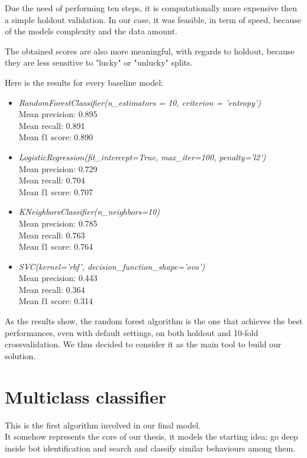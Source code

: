 Due the need of performing ten steps, it is computationally more expensive then a simple holdout validation. In our case, it was feasible, in term of speed, because of the models complexity and the data amount.

The obtained scores are also more meaningful, with regards to holdout, because they are less sensitive to "lucky" or "unlucky" splits.

Here is the results for every baseline model:

\begin{itemize}
	\item[\PencilRight] \textit{RandomForestClassifier(n\_estimators = 10, criterion = 'entropy')}\\
	Mean precision: 0.895\\
	Mean recall: 0.891\\
	Mean f1 score: 0.890
	\item[\PencilRight]\textit{LogisticRegression(fit\_intercept=True, max\_iter=100, penalty='l2')}\\
	Mean precision: 0.729\\
	Mean recall: 0.704\\
	Mean f1 score: 0.707
	\item[\PencilRight]\textit{KNeighborsClassifier(n\_neighbors=10)}\\
	Mean precision: 0.785\\
	Mean recall: 0.763\\
	Mean f1 score: 0.764
	\item[\PencilRight]\textit{SVC(kernel='rbf', decision\_function\_shape='ovo')}\\
	Mean precision: 0.443\\
	Mean recall: 0.364\\
	Mean f1 score: 0.314
\end{itemize}

As the results show, the random forest algorithm is the one that achieves the best performances, even with default settings, on both holdout and 10-fold crossvalidation. We thus decided to consider it as the main tool to build our solution. 

\section{Multiclass classifier}
This is the first algorithm involved in our final model.\\
It somehow represents the core of our thesis, it models the starting idea: go deep inside bot identification and search and classify similar behaviours among them.

